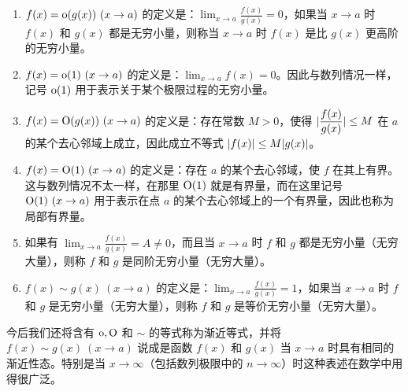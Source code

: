 \begin{enumerate}
  \item $f(x)=\mathrm{o}(g(x))\ (x\to a)$ 的定义是：$\displaystyle\lim_{x\to a}\frac{f(x)}{g(x)}=0$，如果当 $x\to a$ 时 $f(x)$ 和 $g(x)$ 都是无穷小量，则称当 $x\to a$ 时 $f(x)$ 是比 $g(x)$ 更高阶的无穷小量。
  \item $f(x)=\mathrm{o}(1)\ (x\to a)$ 的定义是：$\displaystyle\lim_{x\to a}f(x)=0$。因此与数列情况一样，记号 $\mathrm{o}(1)$ 用于表示关于某个极限过程的无穷小量。
  \item $f(x)=\mathrm{O}(g(x))\ (x\to a)$ 的定义是：存在常数 $M>0$，使得 $\displaystyle\lvert\frac{f(x)}{g(x)}\rvert\leq M$ 在 $a$ 的某个去心邻域上成立，因此成立不等式 $\lvert f(x)\rvert\leq M\lvert g(x)\rvert$。
  \item $f(x)=\mathrm{O}(1)\ (x\to a)$ 的定义是：存在 $a$ 的某个去心邻域，使 $f$ 在其上有界。这与数列情况不太一样，在那里 $\mathrm{O}(1)$ 就是有界量，而在这里记号 $\mathrm{O}(1)\ (x\to a)$ 用于表示在点 $a$ 的某个去心邻域上的一个有界量，因此也称为局部有界量。
  \item 如果有 $\displaystyle\lim_{x\to a}\frac{f(x)}{g(x)}=A\ne0$，而且当 $x\to a$ 时 $f$ 和 $g$ 都是无穷小量（无穷大量），则称 $f$ 和 $g$ 是同阶无穷小量（无穷大量）。
  \item $f(x)\sim g(x)\ (x\to a)$ 的定义是：$\displaystyle\lim_{x\to a}\frac{f(x)}{g(x)}=1$，如果当 $x\to a$ 时 $f$ 和 $g$ 是无穷小量（无穷大量），则称 $f$ 和 $g$ 是等价无穷小量（无穷大量）。
\end{enumerate}

今后我们还将含有 $\mathrm{o},\mathrm{O}$ 和 $\sim$ 的等式称为渐近等式，并将 $f(x)\sim g(x)\ (x\to a)$ 说成是函数 $f(x)$ 和 $g(x)$ 当 $x\to a$ 时具有相同的渐近性态。特别是当 $x\to\infty$（包括数列极限中的 $n\to\infty$）时这种表述在数学中用得很广泛。

